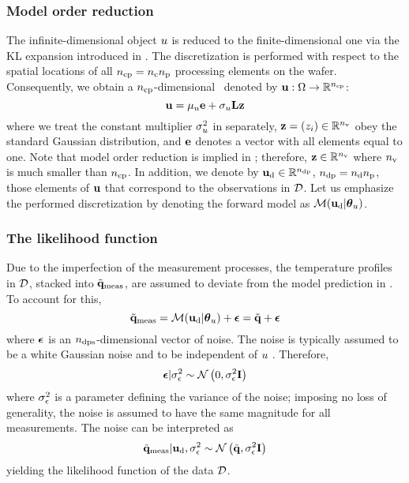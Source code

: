 \subsubsection{Model order reduction} 
The infinite-dimensional object $u$ is reduced to the finite-dimensional one via the KL expansion introduced in . The discretization is performed with respect to the spatial locations of all ${n_\text{cp}} = {n_{\text{c}}} {n_\text{p}}$ processing elements on the wafer. Consequently, we obtain a ${n_\text{cp}}$-dimensional \rv\ denoted by $\mathbf{u}: \Omega \to \mathbb{R}^{n_\text{cp}}$:
\begin{equation} \elabel{kl-approximation}
  \vu = \mu_\u \vI + \sigma_\u \mKL \vz
\end{equation}
where we treat the constant multiplier $\sigma^2_u$ in  separately, $\mathbf{z} = (z_i) \in \mathbb{R}^{n_\text{v}}$ obey the standard Gaussian distribution, and $\mathbf{e}$ denotes a vector with all elements equal to one. Note that model order reduction is implied in ; therefore, $\mathbf{z} \in \mathbb{R}^{n_\text{v}}$ where ${n_\text{v}}$ is much smaller than ${n_\text{cp}}$. In addition, we denote by $\mathbf{u}_{\text{d}} \in \mathbb{R}^{{n_\text{dp}}}$, ${n_\text{dp}} = {n_{\text{d}}} {n_\text{p}}$, those elements of $\mathbf{u}$ that correspond to the observations in $\mathcal{D}$. Let us emphasize the performed discretization by denoting the forward model as $\model{\vu_\data|\vparam_\u}$.

\subsubsection{The likelihood function}
Due to the imperfection of the measurement processes, the temperature profiles in $\mathcal{D}$, stacked into $\tilde{\mathbf{q}}_{\text{meas}}$, are assumed to deviate from the model prediction in . To account for this,
\[
  \mvT_\meas = \model{\vu_\data | \vparam_\u} + \vnoise = \mvT + \vnoise
\]
where $\boldsymbol\epsilon$ is an ${n_\text{dps}}$-dimensional vector of noise. The noise is typically assumed to be a white Gaussian noise and to be independent of $u$ \cite{mackay2003, rasmussen2006, marzouk2009}. Therefore,
\[
  \boldsymbol\epsilon | \sigma^2_\epsilon \sim \mathcal{N}\left( 0, \sigma^2_\epsilon \mathbf{I} \right)
\]
where $\sigma^2_\epsilon$ is a parameter defining the variance of the noise; imposing no loss of generality, the noise is assumed to have the same magnitude for all measurements. The noise can be interpreted as
\begin{equation} \elabel{likelihood}
  \mvT_\meas | \vu_\data, \sigma_\noise^2 \sim \gaussian{\mvT}{\sigma_\noise^2 \mI}
\end{equation}
yielding the likelihood function of the data $\mathcal{D}$.

